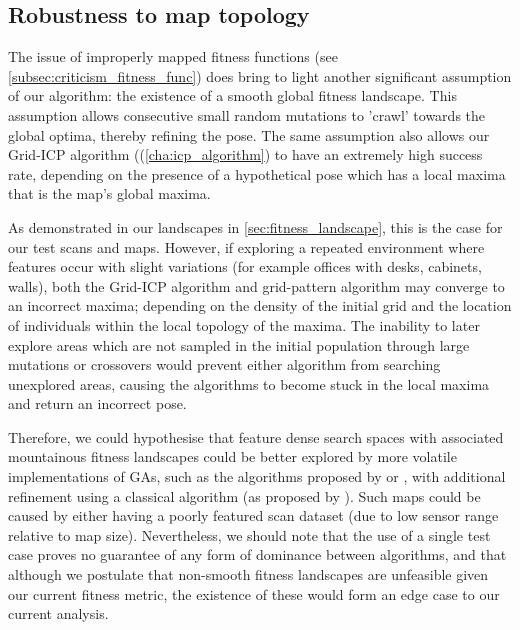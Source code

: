 \documentclass[authoryearcitations]{UoYCSproject}
\begin{document}
\subsection{Robustness to map topology}
\label{subsec:robustness_to_map_topology}

The issue of improperly mapped fitness functions (see \autoref{subsec:criticism_fitness_func}) does bring to light another significant assumption of our algorithm: the existence of a smooth global fitness landscape. This assumption allows consecutive small random mutations to 'crawl' towards the global optima, thereby refining the pose. The same assumption also allows our Grid-ICP algorithm ((\autoref{cha:icp_algorithm}) to have an extremely high success rate, depending on the presence of a hypothetical pose which has a local maxima that is the map's global maxima. \newline

As demonstrated in our landscapes in \autoref{sec:fitness_landscape}, this is the case for our test scans and maps. However, if exploring a repeated environment where features occur with slight variations (for example offices with desks, cabinets, walls), both the Grid-ICP algorithm and grid-pattern algorithm may converge to an incorrect maxima; depending on the density of the initial grid and the location of individuals within the local topology of the maxima. The inability to later explore areas which are not sampled in the initial population through large mutations or crossovers would prevent either algorithm from searching unexplored areas, causing the algorithms to become stuck in the local maxima and return an incorrect pose.\newline

Therefore, we could hypothesise that feature dense search spaces with associated mountainous fitness landscapes could be better explored by more volatile implementations of GAs, such as the algorithms proposed by \citet{Robertson2002-ou} or \citet{Lenac2007-xm}, with additional refinement using a classical algorithm (as proposed by \citet{Lenac2011-co}). Such maps could be caused by either having a poorly featured scan dataset (due to low sensor range relative to map size). Nevertheless, we should note that the use of a single test case proves no guarantee of any form of dominance between algorithms, and that although we postulate that non-smooth fitness landscapes are unfeasible given our current fitness metric, the existence of these would form an edge case to our current analysis.
\end{document}

